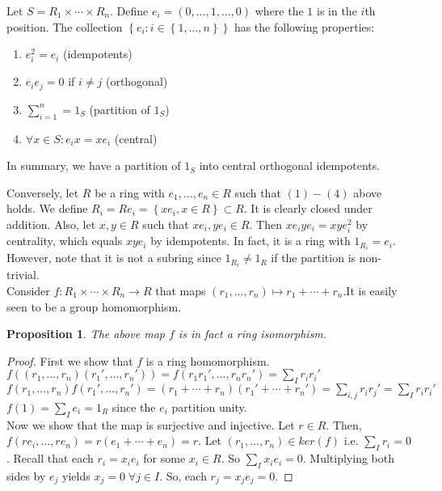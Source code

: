\documentclass{article}
\theoremstyle{definition}
\theoremstyle{remark}
\theoremstyle{plain}
\newtheorem{prop}{Proposition}[subsection]
\begin{document}
Let $S = R_1 \times \cdots \times R_n$. Define $e_i = (0, \ldots, 1, \ldots, 0)$ where the $1$ is in the $i$th position. The collection $\left\{ e_i : i \in \left\{ 1,\ldots, n \right\} \right\}$ has the following properties:
        \begin{enumerate}
            \item $e_i^2 = e_i$ (idempotents)
            \item $e_ie_j = 0$ if $i\neq j$ (orthogonal)
            \item $\sum\limits_{i =1}^n = 1_S$ (partition of $1_S$)
            \item $\forall x \in S : e_ix = xe_i$ (central)
        \end{enumerate}
        In summary, we have a partition of $1_S$ into central orthogonal idempotents.

        Conversely, let \(R\) be a ring with \(e_1,\ldots, e_n \in R\) such that \((1)-(4)\) above holds. We define \(R_i = Re_i = \left\{ xe_i, x\in R \right\} \subset R\). It is clearly closed under addition. Also, let \(x,y\in R\) such that \(xe_i, ye_i \in R\). Then \(xe_iye_i = xye_i^2\) by centrality, which equals \(xye_i\) by idempotents. In fact, it is a ring with \(1_{R_i} = e_i\). However, note that it is not a subring since \(1_{R_i} \neq 1_R\) if the partition is non-trivial. \\

        Consider \(f: R_1\times \cdots \times R_n \to R\) that maps \((r_1,\ldots, r_n) \mapsto r_1 + \cdots + r_n\).It is easily seen to be a group homomorphism. 

        \begin{prop}
            The above map \(f\) is in fact a ring isomorphism.
        \end{prop}
        \begin{proof}
            First we show that \(f\) is a ring homomorphism.\\ 
            \(f((r_1,\ldots, r_n)(r_1',\ldots, r_n')) = f(r_1r_1',\ldots, r_nr_n') = \sum_{I}r_ir_i'\)\\
            \(f(r_1, \ldots, r_n)f(r_1', \ldots, r_n') = (r_1+\cdots+r_n)(r_1'+\cdots+r_n') = \sum_{i,j}r_ir_j' = \sum_{I}r_ir_i' \)\\
            \(f(1) = \sum_{I}e_i = 1_R\) since the \(e_i\) partition unity. \\

            Now we show that the map is surjective and injective. Let \(r\in R\). Then, \(f(re_i, \ldots, re_n) = r(e_1 +\cdots + e_n) = r\).
            Let \( (r_1, \ldots, r_n) \in ker(f)\) i.e. \(\sum_{I}r_i = 0\). Recall that each \(r_i = x_ie_i\) for some \(x_i \in R\). So \(\sum_{I}x_ie_i = 0\). Multiplying both sides by \(e_j\) yields \(x_j = 0 \; \forall j \in I\).
            So, each \(r_j = x_je_j = 0\).
        \end{proof}
\end{document}
